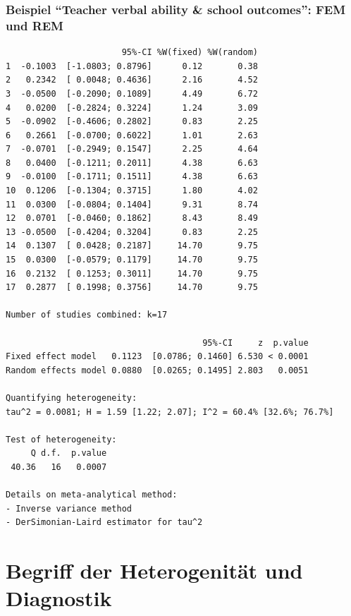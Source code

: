 \begin{frame}\frametitle{Beispiel "`Teacher verbal
    ability \& school outcomes"': FEM und REM}

  \begin{tiny}
\begin{knitrout}
\color{fgcolor}\begin{kframe}
\begin{verbatim}
                       95%-CI %W(fixed) %W(random)
1  -0.1003  [-1.0803; 0.8796]      0.12       0.38
2   0.2342  [ 0.0048; 0.4636]      2.16       4.52
3  -0.0500  [-0.2090; 0.1089]      4.49       6.72
4   0.0200  [-0.2824; 0.3224]      1.24       3.09
5  -0.0902  [-0.4606; 0.2802]      0.83       2.25
6   0.2661  [-0.0700; 0.6022]      1.01       2.63
7  -0.0701  [-0.2949; 0.1547]      2.25       4.64
8   0.0400  [-0.1211; 0.2011]      4.38       6.63
9  -0.0100  [-0.1711; 0.1511]      4.38       6.63
10  0.1206  [-0.1304; 0.3715]      1.80       4.02
11  0.0300  [-0.0804; 0.1404]      9.31       8.74
12  0.0701  [-0.0460; 0.1862]      8.43       8.49
13 -0.0500  [-0.4204; 0.3204]      0.83       2.25
14  0.1307  [ 0.0428; 0.2187]     14.70       9.75
15  0.0300  [-0.0579; 0.1179]     14.70       9.75
16  0.2132  [ 0.1253; 0.3011]     14.70       9.75
17  0.2877  [ 0.1998; 0.3756]     14.70       9.75

Number of studies combined: k=17

                                       95%-CI     z  p.value
Fixed effect model   0.1123  [0.0786; 0.1460] 6.530 < 0.0001
Random effects model 0.0880  [0.0265; 0.1495] 2.803   0.0051

Quantifying heterogeneity:
tau^2 = 0.0081; H = 1.59 [1.22; 2.07]; I^2 = 60.4% [32.6%; 76.7%]

Test of heterogeneity:
     Q d.f.  p.value
 40.36   16   0.0007

Details on meta-analytical method:
- Inverse variance method
- DerSimonian-Laird estimator for tau^2
\end{verbatim}
\end{kframe}
\end{knitrout}

\end{tiny}
\end{frame}


\section{Begriff der Heterogenität und Diagnostik}


